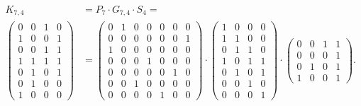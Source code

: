 \begin{itemize}
        \begin{align*}
            K_{7,4}&=P_{7}\cdot G_{7,4}\cdot S_{4}=\\
            \begin{pmatrix} %
                0 & 0 & 1 & 0\\
                1 & 0 & 0 & 1\\
                0 & 0 & 1 & 1\\
                1 & 1 & 1 & 1\\
                0 & 1 & 0 & 1\\
                0 & 1 & 0 & 0\\
                1 & 0 & 0 & 0
            \end{pmatrix}
            &=
            \begin{pmatrix} %
                0 & 1 & 0 & 0 & 0 & 0 & 0\\
                0 & 0 & 0 & 0 & 0 & 0 & 1\\
                1 & 0 & 0 & 0 & 0 & 0 & 0\\
                0 & 0 & 0 & 1 & 0 & 0 & 0\\
                0 & 0 & 0 & 0 & 0 & 1 & 0\\
                0 & 0 & 1 & 0 & 0 & 0 & 0\\
                0 & 0 & 0 & 0 & 1 & 0 & 0
            \end{pmatrix}
            \cdot
            \begin{pmatrix} %
                1 & 0 & 0 & 0\\
                1 & 1 & 0 & 0\\
                0 & 1 & 1 & 0\\
                1 & 0 & 1 & 1\\
                0 & 1 & 0 & 1\\
                0 & 0 & 1 & 0\\
                0 & 0 & 0 & 1
            \end{pmatrix}
            \cdot
            \begin{pmatrix} %
                0 & 0 & 1 & 1\\
                0 & 0 & 0 & 1\\
                0 & 1 & 0 & 1\\
                1 & 0 & 0 & 1
            \end{pmatrix}
            .
        \end{align*}

\end{itemize}
